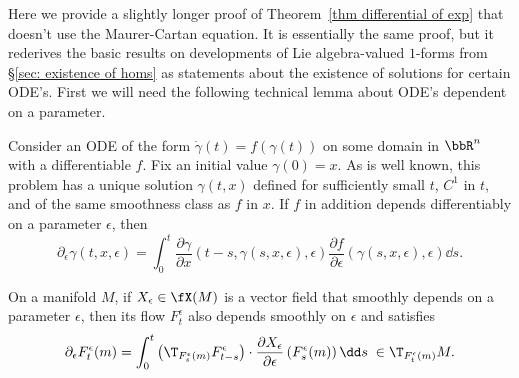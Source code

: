 Here we provide a slightly longer proof of Theorem~\ref{thm differential of exp} that doesn't use the Maurer-Cartan equation. It is essentially the same proof, but it rederives the basic results on developments of Lie algebra-valued $1$-forms from \S\ref{sec: existence of homs} as statements about the existence of solutions for certain ODE's. First we will need the following technical lemma about ODE's dependent on a parameter.
\begin{lem}\label{lem variation formula}
    Consider an ODE of the form $\dot \gamma(t)=f(\gamma(t))$ on some domain in $\bbR^n$ with a differentiable $f$. Fix an initial value $\gamma(0)=x$. As is well known, this problem has a unique solution $\gamma(t,x)$ defined for sufficiently small $t$, $C^1$ in $t$, and of the same smoothness class as $f$ in $x$. If $f$ in addition depends differentiably on a parameter $\epsilon$, then 
    \[\partial_\epsilon \gamma(t,x,\epsilon)=\int_0^t \frac{\partial \gamma}{\partial x}(t-s,\gamma(s,x,\epsilon),\epsilon)\frac{\partial f}{\partial\epsilon}(\gamma(s,x,\epsilon),\epsilon)\dd s.\]

    On a manifold $M$, if $X_\epsilon\in \fX(M)$ is a vector field that smoothly depends on a parameter $\epsilon$, then its flow $F^\epsilon_t$ also depends smoothly on $\epsilon$ and satisfies
    \[\partial_\epsilon F^\epsilon_t(m)=\int_0^t\left(\T_{F^\epsilon_s(m)}F^{\epsilon}_{t-s}\right)\cdot \frac{\partial X_\epsilon}{\partial \epsilon}\left(F^\epsilon_s(m)\right)\dd s\; \in \T_{F^\epsilon_t(m)}M.\label{2702}\]
\end{lem}
